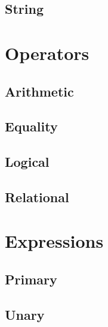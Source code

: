 \documentclass[12pt]{report}
\begin{document}
\section{String}

\chapter{Operators}
\section{Arithmetic}
\section{Equality}
\section{Logical}
\section{Relational}

\chapter{Expressions}
\section{Primary}
\section{Unary}
\end{document}
